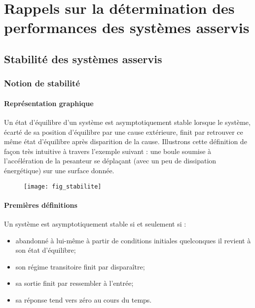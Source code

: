 \setchapterpreamble[u]{\margintoc}

\chapter{Rappels sur la détermination des performances des systèmes asservis}




\section{Stabilité des systèmes asservis}
\subsection{Notion de stabilité}
\subsubsection{Représentation graphique \cite{1}}
Un état d'équilibre d'un système est asymptotiquement stable lorsque le système, écarté de sa position d'équilibre par une
cause extérieure, finit par retrouver ce même état d'équilibre après disparition de la
cause.
Illustrons cette définition de façon très intuitive à travers l'exemple suivant : une boule
soumise à l'accélération de la pesanteur se déplaçant (avec un peu de dissipation
énergétique) sur une surface donnée.

\begin{figure}[H]
\texttt{[image: fig\_stabilite]}
\end{figure}
\subsubsection{Premières définitions}
\begin{defi}

Un système est asymptotiquement stable si et seulement si : 
\begin{itemize}
\item abandonné à lui-même à partir de conditions initiales quelconques il revient à son état d'équilibre;
\item son régime transitoire finit par disparaître;
\item sa sortie finit par ressembler à l'entrée;
\item sa réponse tend vers zéro au cours du temps.
\end{itemize}

\end{defi}

